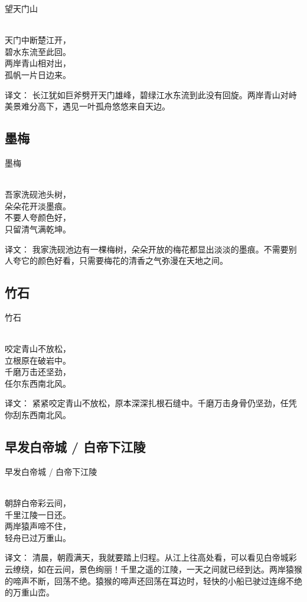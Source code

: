 \noindent 望天门山

  \\

\noindent 天门中断楚江开，\\碧水东流至此回。\\
两岸青山相对出，\\孤帆一片日边来。

译文：
长江犹如巨斧劈开天门雄峰，碧绿江水东流到此没有回旋。两岸青山对峙美景难分高下，遇见一叶孤舟悠悠来自天边。

\subsection{墨梅}

\noindent 墨梅

  \\

\noindent 吾家洗砚池头树，\\朵朵花开淡墨痕。\\
不要人夸颜色好，\\只留清气满乾坤。

译文：
我家洗砚池边有一棵梅树，朵朵开放的梅花都显出淡淡的墨痕。不需要别人夸它的颜色好看，只需要梅花的清香之气弥漫在天地之间。

\subsection{竹石}

\noindent 竹石

  \\

\noindent 咬定青山不放松，\\立根原在破岩中。\\
千磨万击还坚劲，\\任尔东西南北风。

译文：
紧紧咬定青山不放松，原本深深扎根石缝中。千磨万击身骨仍坚劲，任凭你刮东西南北风。

\subsection{早发白帝城 / 白帝下江陵}

\noindent 早发白帝城 / 白帝下江陵

  \\

\noindent 朝辞白帝彩云间，\\千里江陵一日还。\\
两岸猿声啼不住，\\轻舟已过万重山。

译文：
清晨，朝霞满天，我就要踏上归程。从江上往高处看，可以看见白帝城彩云缭绕，如在云间，景色绚丽！千里之遥的江陵，一天之间就已经到达。两岸猿猴的啼声不断，回荡不绝。猿猴的啼声还回荡在耳边时，轻快的小船已驶过连绵不绝的万重山峦。